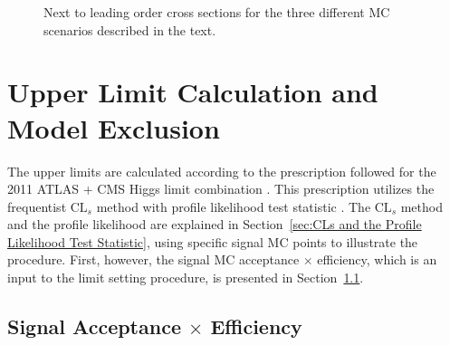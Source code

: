 \documentclass[dissertation.tex]{subfiles}
\begin{document}
\begin{figure}
	\caption{Next to leading order cross sections for the three different MC scenarios described in the text.}
	\label{fig:sig_xsec}
\end{figure}

\section{Upper Limit Calculation and Model Exclusion}
\label{sec:Upper Limit Calculation and Model Exclusion}

The upper limits are calculated according to the prescription followed for the 2011 ATLAS + CMS Higgs limit combination \cite{ATLAS:1379837}.  This prescription utilizes the frequentist $\mbox{CL}_{s}$ method \cite{Read} with profile likelihood test statistic \cite{springerlink:10.1140/epjc/s10052-011-1554-0}.  The $\mbox{CL}_{s}$ method and the profile likelihood are explained in Section~\ref{sec:CLs and the Profile Likelihood Test Statistic}, using specific signal MC points to illustrate the procedure.  First, however, the signal MC acceptance $\times$ efficiency, which is an input to the limit setting procedure, is presented in Section~\ref{sec:Signal Acceptance Times Efficiency}.

\subsection{Signal Acceptance $\times$ Efficiency}
\label{sec:Signal Acceptance Times Efficiency}
\end{document}
